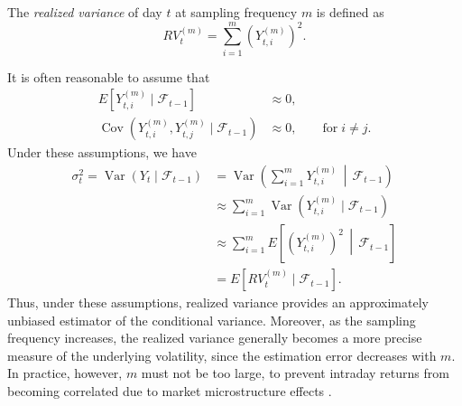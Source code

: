 \begin{definition}
    The \emph{realized variance} of day $t$ at sampling frequency $m$ is defined as
    \begin{equation}
        RV_t^{(m)} = \sum_{i=1}^{m} \left(Y_{t,i}^{(m)}\right)^2.
    \end{equation}
\end{definition}

It is often reasonable to assume that 
\begin{align}
    E\left[Y_{t,i}^{(m)} \mid \mathcal{F}_{t-1}\right] &\approx 0, \\
    \operatorname{Cov}\left(Y_{t,i}^{(m)}, Y_{t,j}^{(m)} \mid \mathcal{F}_{t-1}\right) &\approx 0, \qquad \text{for} \; i \neq j.
\end{align}
Under these assumptions, we have
\begin{align}
    \sigma_t^2 = \operatorname{Var}(Y_t \mid \mathcal{F}_{t-1}) &= \operatorname{Var}\left(\sum_{i=1}^{m} Y_{t,i}^{(m)} \,\middle|\, \mathcal{F}_{t-1}\right) \\
    &\approx \sum_{i=1}^{m} \operatorname{Var}\left(Y_{t,i}^{(m)} \mid \mathcal{F}_{t-1}\right) \\
    &\approx \sum_{i=1}^{m} E\left[\left(Y_{t,i}^{(m)}\right)^2 \,\middle|\, \mathcal{F}_{t-1}\right] \\
    &= E\left[RV_t^{(m)} \mid \mathcal{F}_{t-1}\right].
\end{align}
Thus, under these assumptions, realized variance provides an approximately unbiased estimator of the conditional variance. 
Moreover, as the sampling frequency increases, the realized variance generally becomes a more precise measure of the underlying volatility, since the estimation error decreases with $m$.
In practice, however, $m$ must not be too large, to prevent intraday returns from becoming correlated due to market microstructure effects \cite{hansen2005forecast}.

